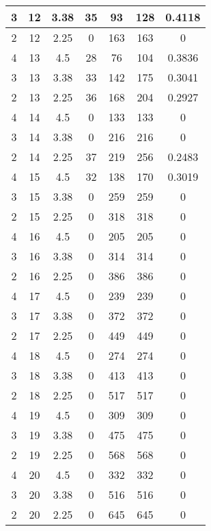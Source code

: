 \documentclass[letterpaper, 12pt]{article}
\begin{document}
\begin{longtable}{|c|c|c|c|c|c|c|}
\hline
3 & 12 & 3.38 & 35 & 93 & 128 & 0.4118 \\
\hline
2 & 12 & 2.25 & 0 & 163 & 163 & 0 \\
\hline
4 & 13 & 4.5 & 28 & 76 & 104 & 0.3836 \\
\hline
3 & 13 & 3.38 & 33 & 142 & 175 & 0.3041 \\
\hline
2 & 13 & 2.25 & 36 & 168 & 204 & 0.2927 \\
\hline
4 & 14 & 4.5 & 0 & 133 & 133 & 0 \\
\hline
3 & 14 & 3.38 & 0 & 216 & 216 & 0 \\
\hline
2 & 14 & 2.25 & 37 & 219 & 256 & 0.2483 \\
\hline
4 & 15 & 4.5 & 32 & 138 & 170 & 0.3019 \\
\hline
3 & 15 & 3.38 & 0 & 259 & 259 & 0 \\
\hline
2 & 15 & 2.25 & 0 & 318 & 318 & 0 \\
\hline
4 & 16 & 4.5 & 0 & 205 & 205 & 0 \\
\hline
3 & 16 & 3.38 & 0 & 314 & 314 & 0 \\
\hline
2 & 16 & 2.25 & 0 & 386 & 386 & 0 \\
\hline
4 & 17 & 4.5 & 0 & 239 & 239 & 0 \\
\hline
3 & 17 & 3.38 & 0 & 372 & 372 & 0 \\
\hline
2 & 17 & 2.25 & 0 & 449 & 449 & 0 \\
\hline
4 & 18 & 4.5 & 0 & 274 & 274 & 0 \\
\hline
3 & 18 & 3.38 & 0 & 413 & 413 & 0 \\
\hline
2 & 18 & 2.25 & 0 & 517 & 517 & 0 \\
\hline
4 & 19 & 4.5 & 0 & 309 & 309 & 0 \\
\hline
3 & 19 & 3.38 & 0 & 475 & 475 & 0 \\
\hline
2 & 19 & 2.25 & 0 & 568 & 568 & 0 \\
\hline
4 & 20 & 4.5 & 0 & 332 & 332 & 0 \\
\hline
3 & 20 & 3.38 & 0 & 516 & 516 & 0 \\
\hline
2 & 20 & 2.25 & 0 & 645 & 645 & 0 \\
\hline
\end{longtable}
\end{document}
